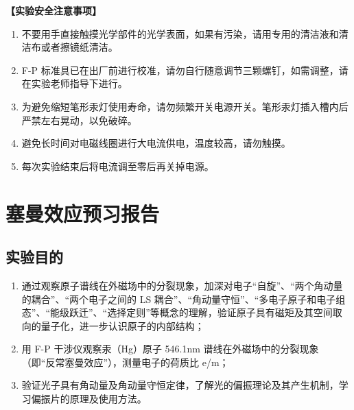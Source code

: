 \documentclass[dvipsnames, svgnames,a4paper,11pt]{article}
\begin{document}
	\textbf{【实验安全注意事项】}	
	\begin{enumerate}
		\item 不要用手直接触摸光学部件的光学表面，如果有污染，请用专用的清洁液和清洁布或者擦镜纸清洁。
		\item F-P 标准具已在出厂前进行校准，请勿自行随意调节三颗螺钉，如需调整，请在实验老师指导下进行。
		\item 为避免缩短笔形汞灯使用寿命，请勿频繁开关电源开关。笔形汞灯插入槽内后严禁左右晃动，以免破碎。
		\item 避免长时间对电磁线圈进行大电流供电，温度较高，请勿触摸。
		\item 每次实验结束后将电流调至零后再关掉电源。
	\end{enumerate}
	\clearpage
	\tableofcontents
	\clearpage

	
	
	
	
	\setcounter{section}{0}
	\section{塞曼效应\quad\heiti 预习报告}
	
	\subsection{实验目的}
	\begin{enumerate}
		\item 通过观察原子谱线在外磁场中的分裂现象，加深对电子“自旋”、“两个角动量的耦合”、“两个电子之间的 LS 耦合”、“角动量守恒”、“多电子原子和电子组态”、“能级跃迁”、“选择定则”等概念的理解，验证原子具有磁矩及其空间取向的量子化，进一步认识原子的内部结构；
		\item 用 F-P 干涉仪观察汞（Hg）原子 546.1nm 谱线在外磁场中的分裂现象（即“反常塞曼效应”），测量电子的荷质比 e/m；
		\item 验证光子具有角动量及角动量守恒定律，了解光的偏振理论及其产生机制，学习偏振片的原理及使用方法。
	\end{enumerate}
	
\end{document}
